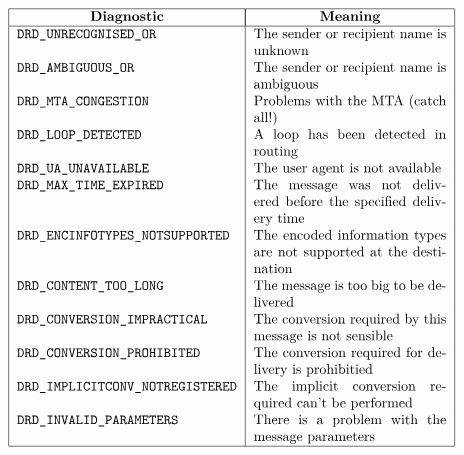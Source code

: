 \[\begin{tabular}{|l|p{0.4\textwidth}|}
\hline
	\multicolumn{1}{|c|}{\bf Diagnostic}&
		\multicolumn{1}{|c|}{\bf Meaning}\\
\hline
	  \tt DRD\_UNRECOGNISED\_OR &
		The sender or recipient name is unknown\\
	  \tt DRD\_AMBIGUOUS\_OR &
		The sender or recipient name is ambiguous\\
	  \tt DRD\_MTA\_CONGESTION &
		Problems with the MTA (catch all!)\\
	  \tt DRD\_LOOP\_DETECTED &
		A loop has been detected in routing\\
	  \tt DRD\_UA\_UNAVAILABLE &
		The user agent is not available\\
	  \tt DRD\_MAX\_TIME\_EXPIRED &
		The message was not delivered before the specified
delivery time\\
	  \tt DRD\_ENCINFOTYPES\_NOTSUPPORTED &
		The encoded information types are not supported at the
destination\\
	  \tt DRD\_CONTENT\_TOO\_LONG &
		The message is too big to be delivered \\
	  \tt DRD\_CONVERSION\_IMPRACTICAL &
		The conversion required by this message is not sensible\\
	  \tt DRD\_CONVERSION\_PROHIBITED &
		The conversion required for delivery is prohibitied\\
	  \tt DRD\_IMPLICITCONV\_NOTREGISTERED &
		The implicit conversion required can't be performed\\
	  \tt DRD\_INVALID\_PARAMETERS &
		There is a problem with the message parameters\\
\hline
\end{tabular}\]
